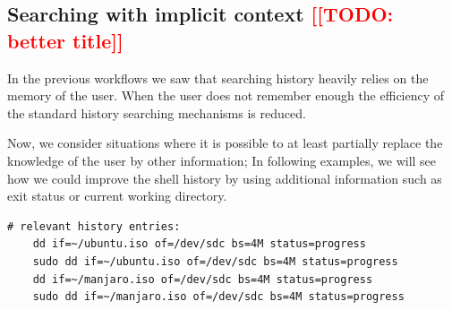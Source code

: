 \documentclass[thesis=M,english]{FITthesis}[2012/10/20]
\newcommand{\redtext}[1]{\textcolor{red}{[[#1]]}}
\begin{document}





\subsection{Searching with implicit context \redtext{TODO: better title}}
In the previous workflows we saw that searching history heavily relies on the memory of the user. When the user does not remember enough the efficiency of the standard history searching mechanisms is reduced.

Now, we consider situations where it is possible to at least partially replace the knowledge of the user by other information; In following examples, we will see how we could improve the shell history by using additional information such as exit status or current working directory.

    
    
\begin{verbatim}
# relevant history entries:        
    dd if=~/ubuntu.iso of=/dev/sdc bs=4M status=progress
    sudo dd if=~/ubuntu.iso of=/dev/sdc bs=4M status=progress
    dd if=~/manjaro.iso of=/dev/sdc bs=4M status=progress
    sudo dd if=~/manjaro.iso of=/dev/sdc bs=4M status=progress
\end{verbatim}
\end{document}
